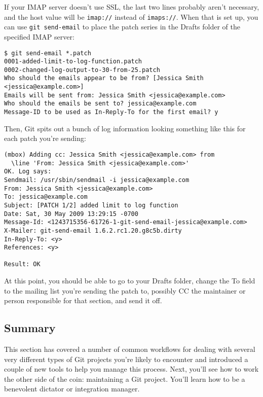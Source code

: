 \documentclass[a4paper]{book}
\begin{document}
If your IMAP server doesn't use SSL, the last two lines probably aren't necessary, and the host value will be \texttt{imap://} instead of \texttt{imaps://}. When that is set up, you can use \texttt{git send-email} to place the patch series in the Drafts folder of the specified IMAP server:

\begin{shaded}\begin{verbatim}
$ git send-email *.patch
0001-added-limit-to-log-function.patch
0002-changed-log-output-to-30-from-25.patch
Who should the emails appear to be from? [Jessica Smith <jessica@example.com>]
Emails will be sent from: Jessica Smith <jessica@example.com>
Who should the emails be sent to? jessica@example.com
Message-ID to be used as In-Reply-To for the first email? y
\end{verbatim}\end{shaded}

Then, Git spits out a bunch of log information looking something like this for each patch you're sending:

\begin{shaded}\begin{verbatim}
(mbox) Adding cc: Jessica Smith <jessica@example.com> from
  \line 'From: Jessica Smith <jessica@example.com>'
OK. Log says:
Sendmail: /usr/sbin/sendmail -i jessica@example.com
From: Jessica Smith <jessica@example.com>
To: jessica@example.com
Subject: [PATCH 1/2] added limit to log function
Date: Sat, 30 May 2009 13:29:15 -0700
Message-Id: <1243715356-61726-1-git-send-email-jessica@example.com>
X-Mailer: git-send-email 1.6.2.rc1.20.g8c5b.dirty
In-Reply-To: <y>
References: <y>

Result: OK
\end{verbatim}\end{shaded}

At this point, you should be able to go to your Drafts folder, change the To field to the mailing list you're sending the patch to, possibly CC the maintainer or person responsible for that section, and send it off.

\subsection{Summary}

This section has covered a number of common workflows for dealing with several very different types of Git projects you're likely to encounter and introduced a couple of new tools to help you manage this process. Next, you'll see how to work the other side of the coin: maintaining a Git project. You'll learn how to be a benevolent dictator or integration manager.
\end{document}
